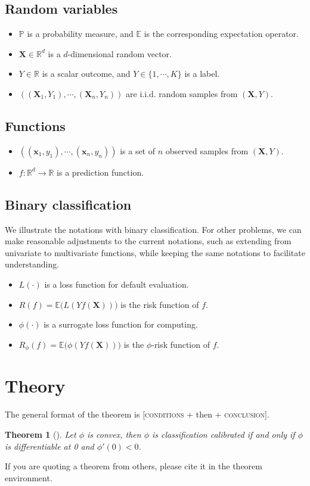 \documentclass[report]{imsart}
\theoremstyle{plain}
\newtheorem{theorem}{Theorem}[section]
\theoremstyle{definition}
\newcommand{\mbf}[1]{\mathbf{#1}}
\begin{document}
\subsection*{Random variables}
\begin{itemize}
\item $\mathbb{P}$ is a probability measure, and $\mathbb{E}$ is the corresponding expectation operator.
\item $\mbf{X} \in \mathbb{R}^d$ is a $d$-dimensional random vector.
\item $Y \in \mathbb{R}$ is a scalar outcome, and $Y \in \{1, \cdots, K\}$ is a label.
\item $((\mbf{X}_1, Y_1), \cdots, (\mbf{X}_n, Y_n))$ are i.i.d. random samples from $(\mbf{X}, Y)$.
\end{itemize}

\subsection*{Functions}
\begin{itemize}
\item $((\mbf{x}_1, y_1), \cdots, (\mbf{x}_n, y_n))$ is a set of $n$ observed samples from $(\mbf{X}, Y)$.
\item $f: \mathbb{R}^d \rightarrow \mathbb{R}$ is a prediction function.
\end{itemize}

\subsection*{Binary classification} We illustrate the notations with binary classification. For other problems, we can make reasonable adjustments to the current notations, such as extending from univariate to multivariate functions, while keeping the same notations to facilitate understanding.
\begin{itemize}
\item $L(\cdot)$ is a loss function for default evaluation.
\item $R(f) = \mathbb{E}\big(L(Yf(\mbf{X}))\big)$ is the risk function of $f$.
\item $\phi(\cdot)$ is a surrogate loss function for computing.
\item $R_\phi(f) = \mathbb{E}\big(\phi(Yf(\mbf{X}))\big)$ is the $\phi$-risk function of $f$.
\end{itemize}

\section{Theory}

The general format of the theorem is [\textsc{conditions} + then + \textsc{conclusion}]. 

\begin{theorem}[\citep{bartlett2006convexity}] Let $\phi$ is convex, then $\phi$ is classification calibrated if and only if $\phi$ is differentiable at 0 and $\phi'(0) < 0$.
\end{theorem}

If you are quoting a theorem from others, please cite it in the theorem environment.



\end{document}
